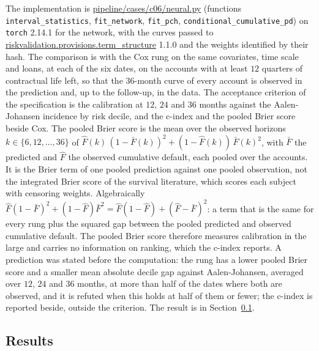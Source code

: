 

The implementation is \url{pipeline/cases/c06/neural.py} (functions \texttt{interval\_statistics}, \texttt{fit\_network}, \texttt{fit\_pch}, \texttt{conditional\_cumulative\_pd}) on \texttt{torch} 2.14.1 for the network, with the curves passed to \url{riskvalidation.provisions.term_structure} 1.1.0 and the weights identified by their hash. The comparison is with the Cox rung
on the same covariates, time scale and loans, at each of the six dates, on the accounts with at least $12$ quarters of contractual life left, so that the $36$-month curve of every account is observed in the prediction and, up to the follow-up, in the data. The acceptance criterion of the specification is the calibration at $12$, $24$ and $36$ months against the Aalen-Johansen incidence by risk decile, and the
c-index and the pooled Brier score beside Cox. The pooled Brier score is the mean over the observed horizons $k\in\{6,12,\dots,36\}$ of $\hat F(k)\,(1-\bar F(k))^{2}+(1-\hat F(k))\,\bar F(k)^{2}$, with $\bar F$ the predicted and $\hat F$ the observed cumulative default, each pooled over the accounts. It is the Brier term of one pooled prediction against one pooled observation, not the integrated Brier score of the survival literature, which scores each subject with censoring weights. Algebraically $\hat F(1-\bar F)^{2}+(1-\hat F)\bar F^{2}=\hat F(1-\hat F)+(\hat F-\bar F)^{2}$: a term that is the same for every rung plus the squared gap between the pooled predicted and observed cumulative default. The pooled Brier score therefore measures calibration in the large and carries no information on ranking, which the c-index reports. A prediction was stated before the computation: the rung has a lower pooled Brier score and a smaller mean absolute decile
gap against Aalen-Johansen, averaged over $12$, $24$ and $36$ months, at more than half of the dates where both are observed, and it is refuted when this holds at half of them or fewer; the c-index is reported beside, outside the criterion. The result is in Section~\ref{sec:results-provisions}.

\subsection{Results}
\label{sec:results-provisions}

